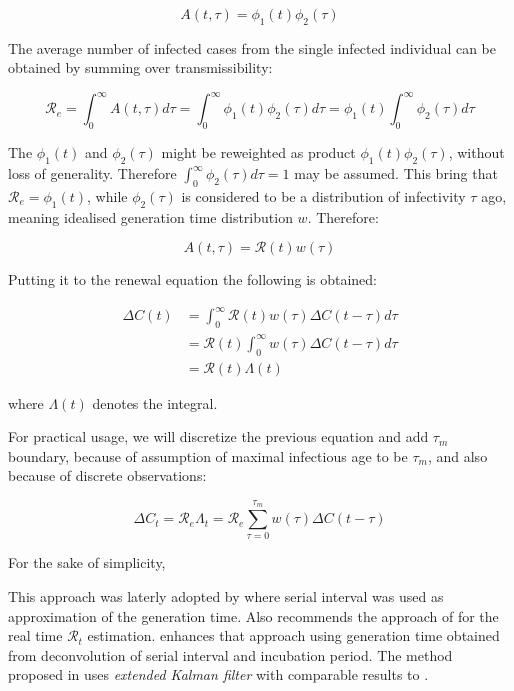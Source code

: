 \documentclass[
  digital, %
  table,   %
  twoside, %
  12pt,
  lof,     %
  lot,     %
]{fithesis3}
\begin{document}
\begin{equation}
A(t, \tau) = \phi_1(t) \phi_2(\tau)
\end{equation}

The average number of infected cases from the single infected 
individual can be obtained by summing over transmissibility:

\begin{equation}
\mathcal{R}_e = \int^{\infty}_0 A(t, \tau) d\tau = \int^{\infty}_0 \phi_1(t) \phi_2(\tau) d\tau = \phi_1(t) \int^{\infty}_0 \phi_2(\tau) d\tau
\end{equation}

The $\phi_1(t)$ and $\phi_2(\tau)$ might be reweighted as 
product $\phi_1(t) \phi_2(\tau)$, without loss of generality. 
Therefore $\int^{\infty}_0 \phi_2(\tau) d\tau = 1$ may be assumed. 
This bring that $\mathcal{R}_e = \phi_1(t)$, while $\phi_2(\tau)$ 
is considered to be a distribution of infectivity $\tau$ ago, 
meaning idealised generation time distribution $w$. 
Therefore:

\begin{equation}
A(t, \tau) = \mathcal{R}(t) w(\tau)
\end{equation}

Putting it to the renewal equation the following is obtained:

\begin{equation}
  \begin{split}
    \Delta C(t) & = \int^{\infty}_0 \mathcal{R}(t) w(\tau) \Delta C(t - \tau) d\tau \\
    & = \mathcal{R}(t) \int^{\infty}_0 w(\tau) \Delta C(t - \tau) d\tau\\
    & = \mathcal{R}(t) \Lambda(t)    
  \end{split}
\end{equation}

where $\Lambda(t)$ denotes the integral.

For practical usage, we will discretize the previous equation 
and add $\tau_m$ boundary, because of assumption of maximal 
infectious age to be $\tau_m$, and also because of discrete 
observations:

\begin{equation}
\Delta C_t = \mathcal{R}_e \Lambda_t = \mathcal{R}_e \sum^{\tau_m}_{\tau=0} w(\tau) \Delta C(t - \tau)
\end{equation}

For the sake of simplicity, 

This approach was laterly adopted by \cite{cori2013} where serial 
interval was used as approximation of the generation time.
Also \cite{gostic2020} recommends the approach of \cite{cori2013} 
for the real time $\mathcal{R}_t$ estimation. \cite{knight2020} 
enhances that approach using generation time obtained from 
deconvolution of serial interval and incubation period. 
The method proposed in \cite{hasan2020} uses 
\textit{extended Kalman filter} with comparable results 
to \cite{cori2013}.
\end{document}
